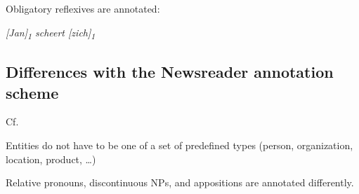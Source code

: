 \begin{itemize*}
\begin{itemize*}
    \end{itemize*}
    
\item Obligatory reflexives are annotated:

    \emph{{[}Jan{]}\textsubscript{1} scheert
  {[}zich{]}\textsubscript{1}}
  
\end{itemize*}


\subsection{Differences with the Newsreader annotation scheme}
Cf. \citet{schoen2014newsreader}
\begin{itemize*}
\item Entities do not have to be one of a set of predefined types (person,
  organization, location, product, \dots)
\item Relative pronouns, discontinuous NPs, and appositions are annotated
  differently.
\end{itemize*}



